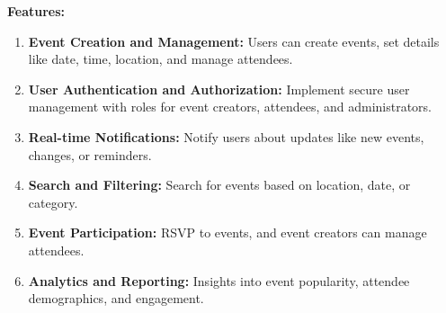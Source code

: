 \documentclass[
]{elteikthesis}[2024/10/26]
\begin{document}
\begin{center}
{\noindent \textbf{Features:}
\begin{enumerate}
    \item \textbf{Event Creation and Management:} Users can create events, set details like date, time, location, and manage attendees.
    \item \textbf{User Authentication and Authorization:} Implement secure user management with roles for event creators, attendees, and administrators.
    \item \textbf{Real-time Notifications:} Notify users about updates like new events, changes, or reminders.
    \item \textbf{Search and Filtering:} Search for events based on location, date, or category.
    \item \textbf{Event Participation:} RSVP to events, and event creators can manage attendees.
    \item \textbf{Analytics and Reporting:} Insights into event popularity, attendee demographics, and engagement.
\end{enumerate}
}
\end{center}

\vfill %

\cleardoublepage

\tableofcontents
\cleardoublepage


\cleardoublepage


\cleardoublepage


\cleardoublepage


\cleardoublepage




{}
\printbibliography[title=\biblabel]
\cleardoublepage

{}
\listoffigures
\cleardoublepage



{}
\lstlistoflistings
\cleardoublepage
\end{document}
